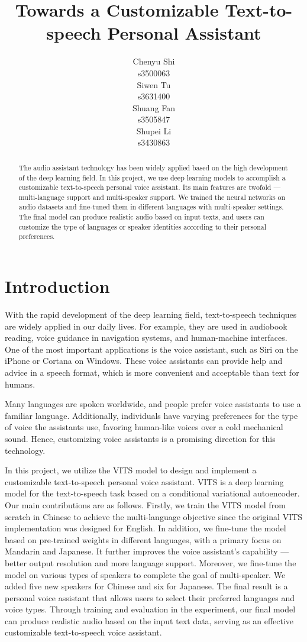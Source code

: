 \documentclass{article}
\title{Towards a Customizable Text-to-speech Personal Assistant}
\author{
 Chenyu Shi\\
   s3500063\\
   \And
 Siwen Tu\\
   s3631400\\
   \And
 Shuang Fan \\
   s3505847\\
   \And
 Shupei Li \\
   s3430863\\
}
\begin{document}
\maketitle
\begin{abstract}
The audio assistant technology has been widely applied based on the high development of the deep learning field. In this project, we use deep learning models to accomplish a customizable text-to-speech personal voice assistant. Its main features are twofold --- multi-language support and multi-speaker support. We trained the neural networks on audio datasets and fine-tuned them in different languages with multi-speaker settings. The final model can produce realistic audio based on input texts, and users can customize the type of languages or speaker identities according to their personal preferences.
\end{abstract}




\section{Introduction}
\label{sec:intro}

With the rapid development of the deep learning field, text-to-speech techniques are widely applied in our daily lives. For example, they are used in audiobook reading, voice guidance in navigation systems, and human-machine interfaces. One of the most important applications is the voice assistant, such as Siri on the iPhone or Cortana on Windows. These voice assistants can provide help and advice in a speech format, which is more convenient and acceptable than text for humans.

Many languages are spoken worldwide, and people prefer voice assistants to use a familiar language. Additionally, individuals have varying preferences for the type of voice the assistants use, favoring human-like voices over a cold mechanical sound. Hence, customizing voice assistants is a promising direction for this technology.

In this project, we utilize the VITS model \cite{2021kim} to design and implement a customizable text-to-speech personal voice assistant. VITS is a deep learning model for the text-to-speech task based on a conditional variational autoencoder. Our main contributions are as follows. Firstly, we train the VITS model from scratch in Chinese to achieve the multi-language objective since the original VITS implementation was designed for English. In addition, we fine-tune the model based on pre-trained weights in different languages, with a primary focus on Mandarin and Japanese. It further improves the voice assistant's capability --- better output resolution and more language support. Moreover, we fine-tune the model on various types of speakers to complete the goal of multi-speaker. We added five new speakers for Chinese and six for Japanese. The final result is a personal voice assistant that allows users to select their preferred languages and voice types. Through training and evaluation in the experiment, our final model can produce realistic audio based on the input text data, serving as an effective customizable text-to-speech voice assistant.
\end{document}
